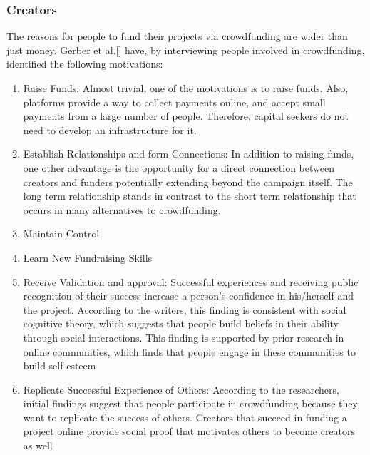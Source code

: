 \subsubsection*{Creators}
The reasons for people to fund their projects via crowdfunding are wider than just money. Gerber et al.[\cite{inproceedings}]
have, by interviewing people involved in crowdfunding, identified the following motivations:
\begin{enumerate}
      \item Raise Funds:
            Almost trivial, one of the motivations is to raise funds. Also, platforms provide a way to
            collect payments online, and accept small payments from a large number of people. Therefore, capital
            seekers do not need to develop an infrastructure for it.

      \item Establish Relationships and form Connections:
            In addition to raising funds, one other advantage is the opportunity for a direct
            connection between creators and funders potentially extending beyond the campaign itself. The
            long term relationship stands in contrast to the short term relationship that occurs in many alternatives
            to crowdfunding.

      \item Maintain Control

      \item Learn New Fundraising Skills

      \item Receive Validation and approval:
            Successful experiences and receiving public recognition of their success increase
            a person’s confidence in his/herself and the project. According to the writers, this finding is consistent
            with social cognitive theory, which suggests that people build beliefs in their ability through social interactions. This finding is supported by prior research in online communities, which finds that people
            engage in these communities to build self-esteem

      \item Replicate Successful Experience of Others:
            According to the researchers, initial findings suggest that
            people participate in crowdfunding because they want to replicate the success of others. Creators that
            succeed in funding a project online provide social proof that motivates others to become creators as
            well


\end{enumerate}
